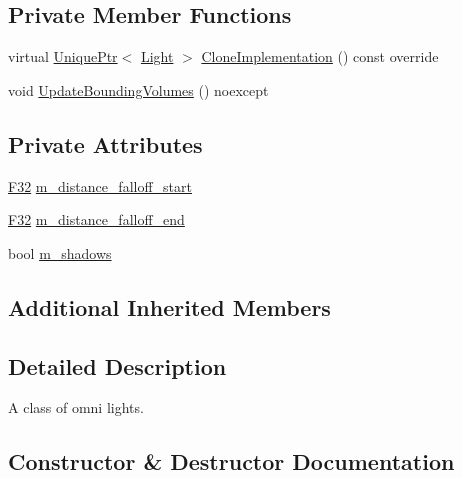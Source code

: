 \subsection*{Private Member Functions}
\begin{DoxyCompactItemize}
\item 
virtual \hyperlink{namespacemage_a3316d7143a973e37adf1110f2e80ca31}{Unique\+Ptr}$<$ \hyperlink{classmage_1_1_light}{Light} $>$ \hyperlink{classmage_1_1_omni_light_a1212457828cdd96cc7170767b7bd1223}{Clone\+Implementation} () const override
\item 
void \hyperlink{classmage_1_1_omni_light_a6a10cdc0ed276d68e5378eaf934158e1}{Update\+Bounding\+Volumes} () noexcept
\end{DoxyCompactItemize}
\subsection*{Private Attributes}
\begin{DoxyCompactItemize}
\item 
\hyperlink{namespacemage_aa97e833b45f06d60a0a9c4fc22ae02c0}{F32} \hyperlink{classmage_1_1_omni_light_a1f879f4aaf9b9e7545ee5efb91b45dc5}{m\+\_\+distance\+\_\+falloff\+\_\+start}
\item 
\hyperlink{namespacemage_aa97e833b45f06d60a0a9c4fc22ae02c0}{F32} \hyperlink{classmage_1_1_omni_light_adca1b76cdcc29215aae6f25ea57327c5}{m\+\_\+distance\+\_\+falloff\+\_\+end}
\item 
bool \hyperlink{classmage_1_1_omni_light_a63e5dab12be5021815e98c81dd9aed6a}{m\+\_\+shadows}
\end{DoxyCompactItemize}
\subsection*{Additional Inherited Members}


\subsection{Detailed Description}
A class of omni lights. 

\subsection{Constructor \& Destructor Documentation}
\hypertarget{classmage_1_1_omni_light_a94794dd7c19fcac0c0d0b9d83108513b}{}\label{classmage_1_1_omni_light_a94794dd7c19fcac0c0d0b9d83108513b} 

